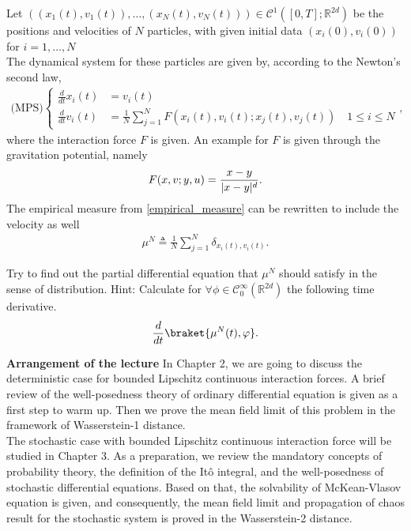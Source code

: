 Let $  ((x_{1}(t),v_{1}(t)),\ldots ,(x_N(t),v_N(t))) \in \mathcal{C}^{1}([0,T];\mathbb{R}^{2d} ) $ be the positions and velocities of $N$ particles, with given initial data
$(x_i(0),v_i(0))$  for $i = 1,\ldots ,N$\\[1ex]
The dynamical system for these particles are given by, according to the Newton's second law,  
  \begin{align*}
    \text{(MPS)}\begin{cases}
      \frac{d}{dt} x_i(t) &= v_i(t) \\
      \frac{d}{dt} v_i(t) &= \frac{1}{N} \sum_{j=1}^{N} F(x_{i}(t),v_i(t) ; x_j(t),v_j(t) )  \quad 1\le i\le N
    \end{cases}
  ,\end{align*}
where the interaction force $F$ is given. An example for $F$ is given through the gravitation potential, namely 
\begin{align*}
  F(x,v;y,u) = \frac{x-y}{\lvert x-y\rvert^{d} }
.\end{align*}
The empirical measure from \autoref{empirical_measure} can be rewritten to include the velocity as well 
\begin{align*}
  \mu^N \triangleq \frac{1}{N} \sum_{j=1}^{N} \delta_{x_i(t),v_i(t)} 
.\end{align*}
\begin{exercise}
Try to find out the partial differential equation that $\mu^N$ should satisfy in the sense of distribution. Hint: Calculate  for $\forall  \phi  \in  \mathcal{C}_0^{\infty}(\mathbb{R}^{2d} ) $  the following time derivative.
 \begin{align*}
   \frac{d}{dt} \braket{\mu^N(t),\phi }
 .\end{align*}
\end{exercise}
\newpage
{\bf Arrangement of the lecture}
In Chapter 2, we are going to discuss the deterministic case for bounded Lipschitz continuous interaction forces. A brief review of the well-posedness theory of ordinary
differential equation is given as a first step to warm up. Then we prove the mean field limit of this problem in the framework of Wasserstein-1 distance.\\[1ex]
The stochastic case with bounded Lipschitz continuous interaction force will be studied in Chapter 3. As a preparation, we review the mandatory concepts
of probability theory, the definition of the It\^{o} integral, and the well-posedness of stochastic differential equations. Based on that, the solvability of McKean-Vlasov equation is given, and consequently, the mean field limit and propagation of chaos result for the stochastic system is proved in the Wasserstein-2 distance. \\[1ex]
